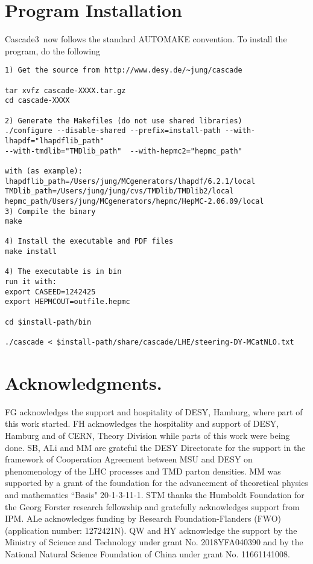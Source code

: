 \documentclass[11pt]{article} \usepackage{mystyle-new}
\def\cascade{{\sc Cascade3}}
\begin{document}
\section{Program Installation}
\cascade\ now follows the standard AUTOMAKE
convention. To install the program, do the following
\begin{footnotesize}
\begin{verbatim}
1) Get the source from http://www.desy.de/~jung/cascade

tar xvfz cascade-XXXX.tar.gz
cd cascade-XXXX

2) Generate the Makefiles (do not use shared libraries)
./configure --disable-shared --prefix=install-path --with-lhapdf="lhapdflib_path" 
--with-tmdlib="TMDlib_path"  --with-hepmc2="hepmc_path"

with (as example):
lhapdflib_path=/Users/jung/MCgenerators/lhapdf/6.2.1/local
TMDlib_path=/Users/jung/jung/cvs/TMDlib/TMDlib2/local
hepmc_path/Users/jung/MCgenerators/hepmc/HepMC-2.06.09/local
3) Compile the binary
make

4) Install the executable and PDF files
make install 

4) The executable is in bin
run it with:
export CASEED=1242425
export HEPMCOUT=outfile.hepmc

cd $install-path/bin

./cascade < $install-path/share/cascade/LHE/steering-DY-MCatNLO.txt

\end{verbatim}
\end{footnotesize}
 
\section*{Acknowledgments.}
FG acknowledges the support and hospitality of DESY, Hamburg, where part of this work started.  
FH acknowledges the hospitality and support of DESY, Hamburg and of CERN, Theory Division while parts of this work were being done. 
SB, ALi and MM are grateful the DESY Directorate for the support in the framework of Cooperation Agreement between MSU and DESY 
on phenomenology of the LHC processes and TMD parton densities.
MM was supported by a grant of the foundation for the advancement of theoretical physics and mathematics ``Basis" 20-1-3-11-1.
STM thanks the Humboldt Foundation for the Georg Forster research fellowship  and 
gratefully acknowledges support from IPM.    
ALe acknowledges funding by Research Foundation-Flanders (FWO) (application number: 1272421N).
QW and HY acknowledge the support by the Ministry of Science and Technology under grant No. 2018YFA040390 and 
by the National Natural Science Foundation of China under grant No. 11661141008. 
\end{document}

